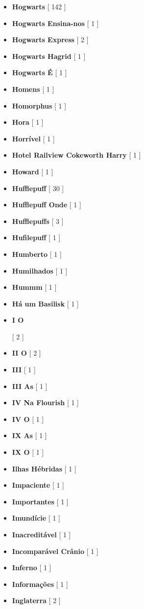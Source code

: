 \documentclass[a4paper]{article}
\begin{document}
{\begin{itemize}
	\item \textbf{Hogwarts} [ 142 ]
	\item \textbf{Hogwarts Ensina-nos} [ 1 ]
	\item \textbf{Hogwarts Express} [ 2 ]
	\item \textbf{Hogwarts Hagrid} [ 1 ]
	\item \textbf{Hogwarts É} [ 1 ]
	\item \textbf{Homens} [ 1 ]
	\item \textbf{Homorphus} [ 1 ]
	\item \textbf{Hora} [ 1 ]
	\item \textbf{Horrível} [ 1 ]
	\item \textbf{Hotel Railview Cokeworth Harry} [ 1 ]
	\item \textbf{Howard} [ 1 ]
	\item \textbf{Hufflepuff} [ 30 ]
	\item \textbf{Hufflepuff Onde} [ 1 ]
	\item \textbf{Hufflepuffs} [ 3 ]
	\item \textbf{Hufilepuff} [ 1 ]
	\item \textbf{Humberto} [ 1 ]
	\item \textbf{Humilhados} [ 1 ]
	\item \textbf{Hummm} [ 1 ]
	\item \textbf{Há um Basilisk} [ 1 ]
	\item \hypertarget{I}{\textbf{I O}} [ 2 ]
	\item \textbf{II O} [ 2 ]
	\item \textbf{III} [ 1 ]
	\item \textbf{III As} [ 1 ]
	\item \textbf{IV Na Flourish} [ 1 ]
	\item \textbf{IV O} [ 1 ]
	\item \textbf{IX As} [ 1 ]
	\item \textbf{IX O} [ 1 ]
	\item \textbf{Ilhas Hébridas} [ 1 ]
	\item \textbf{Impaciente} [ 1 ]
	\item \textbf{Importantes} [ 1 ]
	\item \textbf{Imundície} [ 1 ]
	\item \textbf{Inacreditável} [ 1 ]
	\item \textbf{Incomparável Crânio} [ 1 ]
	\item \textbf{Inferno} [ 1 ]
	\item \textbf{Informações} [ 1 ]
	\item \textbf{Inglaterra} [ 2 ]

\end{itemize}}
\end{document}
